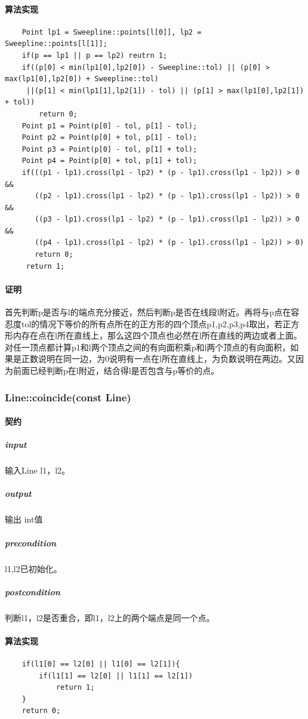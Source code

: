 \documentclass[a4paper]{book}
\numberwithin{equation}{chapter}
\theoremstyle{definition}
\begin{document}
\paragraph{算法实现}
\begin{lstlisting}
	Point lp1 = Sweepline::points[l[0]], lp2 = Sweepline::points[l[1]];
	if(p == lp1 || p == lp2) reutrn 1;
	if((p[0] < min(lp1[0],lp2[0]) - Sweepline::tol) || (p[0] > max(lp1[0],lp2[0]) + Sweepline::tol)
	 ||(p[1] < min(lp1[1],lp2[1]) - tol) || (p[1] > max(lp1[0],lp2[1]) + tol))
		return 0;
	Point p1 = Point(p[0] - tol, p[1] - tol);
	Point p2 = Point(p[0] + tol, p[1] - tol);
	Point p3 = Point(p[0] - tol, p[1] + tol);
	Point p4 = Point(p[0] + tol, p[1] + tol);
	if(((p1 - lp1).cross(lp1 - lp2) * (p - lp1).cross(lp1 - lp2)) > 0 &&
	   ((p2 - lp1).cross(lp1 - lp2) * (p - lp1).cross(lp1 - lp2)) > 0 &&
	   ((p3 - lp1).cross(lp1 - lp2) * (p - lp1).cross(lp1 - lp2)) > 0 &&
	   ((p4 - lp1).cross(lp1 - lp2) * (p - lp1).cross(lp1 - lp2)) > 0)
	   return 0;
	 return 1;
\end{lstlisting}
\paragraph{证明}
首先判断p是否与l的端点充分接近，然后判断p是否在线段l附近。再将与p点在容忍度tol的情况下等价的所有点所在的正方形的四个顶点p1,p2,p3,p4取出，若正方形内存在点在l所在直线上，那么这四个顶点也必然在l所在直线的两边或者上面。对任一顶点都计算p1和l两个顶点之间的有向面积乘p和l两个顶点的有向面积，如果是正数说明在同一边，为0说明有一点在l所在直线上，为负数说明在两边。又因为前面已经判断p在l附近，结合得l是否包含与p等价的点。

\subsubsection{Line::coincide(const Line)}
\paragraph{契约}
\subparagraph{input}
输入Line l1，l2。
\subparagraph{output}
输出 int值
\subparagraph{precondition}
l1,l2已初始化。
\subparagraph{postcondition}
判断l1，l2是否重合，即l1，l2上的两个端点是同一个点。
\paragraph{算法实现}
\begin{lstlisting}
	if(l1[0] == l2[0] || l1[0] == l2[1]){
		if(l1[1] == l2[0] || l1[1] == l2[1])
			return 1;
	}
	return 0;
	
\end{lstlisting}
\end{document}
